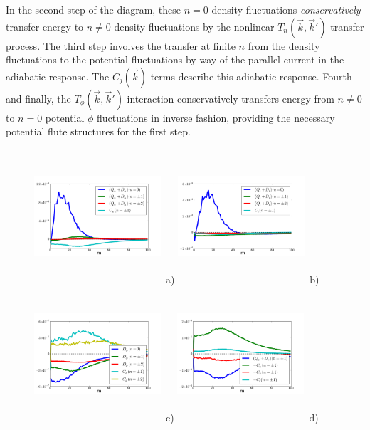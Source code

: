 \documentclass[showpacs,preprintnumbers,amsmath,amssymb,superscriptaddress]{revtex4}
\begin{document}
In the second step of the diagram, these $n=0$ density fluctuations
\emph{conservatively} transfer energy to $n \ne 0$ density fluctuations by the nonlinear $T_n(\vec{k},\vec{k}')$ transfer process. 
The third step involves the transfer at finite $n$ from the density
fluctuations to the potential fluctuations by way of the parallel current in the adiabatic response. The $C_j(\vec{k})$ terms describe this adiabatic response.
Fourth and finally, the $T_\phi(\vec{k},\vec{k}')$ interaction conservatively transfers energy from
$n \ne 0$ to $n=0$ potential $\phi$ fluctuations in inverse fashion, providing the necessary potential flute structures for the first step.

\begin{figure}
\includegraphics[width=0.42\textwidth,height=50mm]{density_dynamics}~a)
\hfil
\includegraphics[width=0.42\textwidth,height=50mm]{temperature_dynamics}~b)
\hfil
\includegraphics[width=0.42\textwidth,height=50mm]{potential_dynamics}~c)
\hfil
\includegraphics[width=0.42\textwidth,height=50mm]{parallel_dynamics}~d)

\end{figure}
\end{document}
